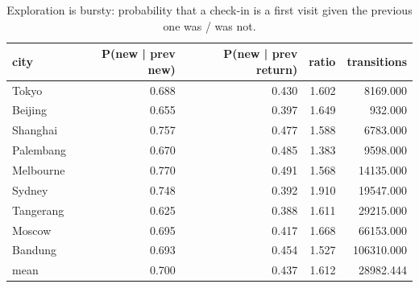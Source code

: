 \begin{table}[t]
\centering\small
\caption{Exploration is bursty: probability that a check-in is a first visit given the previous one was / was not.}
\label{tab:A8_momentum}
\begin{tabular}{lrrrr}
\toprule
city & P(new | prev new) & P(new | prev return) & ratio & transitions \\
\midrule
Tokyo & 0.688 & 0.430 & 1.602 & 8169.000 \\
Beijing & 0.655 & 0.397 & 1.649 & 932.000 \\
Shanghai & 0.757 & 0.477 & 1.588 & 6783.000 \\
Palembang & 0.670 & 0.485 & 1.383 & 9598.000 \\
Melbourne & 0.770 & 0.491 & 1.568 & 14135.000 \\
Sydney & 0.748 & 0.392 & 1.910 & 19547.000 \\
Tangerang & 0.625 & 0.388 & 1.611 & 29215.000 \\
Moscow & 0.695 & 0.417 & 1.668 & 66153.000 \\
Bandung & 0.693 & 0.454 & 1.527 & 106310.000 \\
mean & 0.700 & 0.437 & 1.612 & 28982.444 \\
\bottomrule
\end{tabular}
\end{table}
